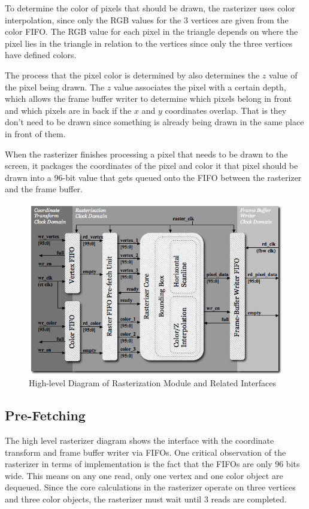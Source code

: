 \documentclass[letterpaper,10pt]{article}
\begin{document}
To determine the color of pixels that should be drawn, the rasterizer uses color interpolation, since only the RGB values for the 3 vertices are given from the color FIFO. The RGB value for each pixel in the triangle depends on where the pixel lies in the triangle in relation to the vertices since only the three vertices have defined colors.

The process that the pixel color is determined by also determines the $z$ value of the pixel being drawn. The $z$ value associates the pixel with a certain depth, which allows the frame buffer writer to determine which pixels belong in front and which pixels are in back if the $x$ and $y$ coordinates overlap. That is they don't need to be drawn since something is already being drawn in the same place in front of them. 

When the rasterizer finishes processing a pixel that needs to be drawn to the screen, it packages the coordinates of the pixel and color it that pixel should be drawn into a 96-bit value that gets queued onto the FIFO between the rasterizer and the frame buffer. 

\begin{figure}[h!]
\begin{center}
\includegraphics[scale=.80]{raster_high_level.png}
\end{center}
\caption{High-level Diagram of Rasterization Module and Related Interfaces}
\label{fig:raster_high_level}
\end{figure}

\subsection{Pre-Fetching}
The high level rasterizer diagram shows the interface with the coordinate transform and frame buffer writer via FIFOs. One critical observation of the rasterizer in terms of implementation is the fact that the FIFOs are only 96 bits wide. This means on any one read, only one vertex and one color object are dequeued. Since the core calculations in the rasterizer operate on three vertices and three color objects, the rasterizer must wait until 3 reads are completed.
\end{document}
